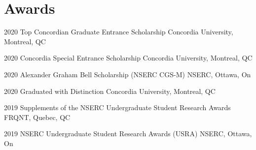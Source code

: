 \documentclass[]{friggeri-cv} %
\begin{document}
\section{Awards}
\begin{entrylist}
	\vspace{-7pt}
																								    			
																											
	\entry
	{2020}
	{Top Concordian Graduate Entrance Scholarship}
	{Concordia University, Montreal, QC}
	{}
	\vspace{-7pt}
																											
																											
	\entry
	{2020}
	{Concordia Special Entrance Scholarship}
	{Concordia University, Montreal, QC}
	{}
	\vspace{-7pt}
																											
																											
	\entry
	{2020}
	{Alexander Graham Bell Scholarship (NSERC CGS-M)}
	{NSERC, Ottawa, On}
	{}
	\vspace{-7pt}
																							    
																											
	\entry
	{2020}
	{Graduated with Distinction}
	{Concordia University, Montreal, QC}
	{}
	\vspace{-7pt}
																											
																											
	\entry
	{2019}
	{Supplements of the NSERC Undergraduate Student Research Awards}
	{FRQNT, Quebec, QC}
	{}
	\vspace{-7pt}
																											
																											
	\entry
	{2019}
	{NSERC Undergraduate Student Research Awards (USRA) }
	{NSERC, Ottawa, On}
	{}
	\vspace{-7pt}
																											
																											
\end{entrylist}
\end{document}
